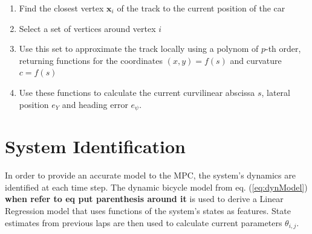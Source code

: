 \begin{enumerate}
\item Find the closest vertex $\bm{x}_i$ of the track to the current position of the car
\item Select a set of vertices around vertex $i$
\item Use this set to approximate the track locally using a polynom of $p$-th order, returning functions for the coordinates $(x,y)=f(s)$ and curvature $c=f(s)$
\item Use these functions to calculate the current curvilinear abscissa $s$, lateral position $e_Y$ and heading error $e_\psi$.
\end{enumerate}

\section{System Identification}\label{sec:sysID}
In order to provide an accurate model to the MPC, the system's dynamics are identified at each time step. The dynamic bicycle model from eq. (\eqref{eq:dynModel}) {\bfseries{when refer to eq put parenthesis around it}} is used to derive a Linear Regression model that uses functions of the system's states as features. State estimates from previous laps are then used to calculate current parameters $\theta_{i,j}$.

